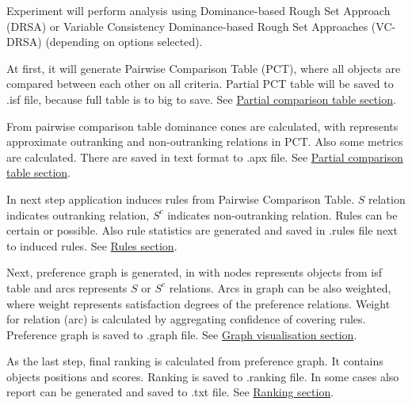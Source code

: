  Experiment will perform analysis using Dominance-based Rough Set Approach (DRSA) or Variable Consistency Dominance-based Rough Set Approaches (VC-DRSA) (depending on options selected).
 
 At first, it will generate Pairwise Comparison Table (PCT), where all objects are compared between each other on all criteria. Partial PCT table will be saved to .isf file, because full table is to big to save.
 See \hyperref[sub:pct-isf]{Partial comparison table section}.
 
 From pairwise comparison table dominance cones are calculated, with represents approximate outranking and non-outranking relations in PCT. Also some metrics are calculated. There are saved in text format to .apx file. 
 See \hyperref[sub:pct-apx]{Partial comparison table section}.
 
 In next step application induces rules from Pairwise Comparison Table. $S$ relation indicates outranking relation, $S^{c}$ indicates non-outranking relation. Rules can be certain or possible. Also rule statistics are generated and saved in .rules file next to induced rules. 
 See \hyperref[section:rules]{Rules section}.
 
 Next, preference graph is generated, in with nodes represents objects from isf table and arcs represents $S$ or $S^{c}$ relations. Arcs in graph can be also weighted, where weight represents satisfaction degrees of the preference relations. Weight for relation (arc) is calculated by aggregating confidence of covering rules. Preference graph is saved to .graph file.
 See \hyperref[section:graph]{Graph visualisation section}.
 
 As the last step, final ranking is calculated from preference graph. It contains objects positions and scores. Ranking is saved to .ranking file. In some cases also report can be generated and saved to .txt file.
  See \hyperref[section:ranking]{Ranking section}.
 
 
\vfill\newpage